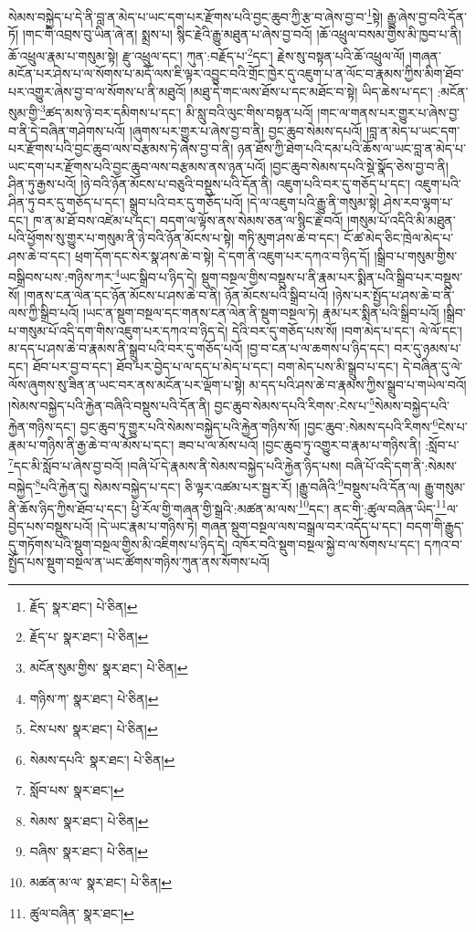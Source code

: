 སེམས་བསྐྱེད་པ་དེ་ནི་བླ་ན་མེད་པ་ཡང་དག་པར་རྫོགས་པའི་བྱང་ཆུབ་ཀྱི་རྩ་བ་ཞེས་བྱ་བ་\footnote{རྗོད་  སྣར་ཐང་།  པེ་ཅིན། }སྟེ། རྒྱུ་ཞེས་བྱ་བའི་དོན་ཏོ། །གང་གི་འབྲས་བུ་ཡིན་ཞེ་ན། སྨྲས་པ། སྙིང་རྗེའི་རྒྱུ་མཐུན་པ་ཞེས་བྱ་བའོ། །ཆོ་འཕྲུལ་བསམ་གྱིས་མི་ཁྱབ་པ་ནི། ཆོ་འཕྲུལ་རྣམ་པ་གསུམ་སྟེ། རྫུ་འཕྲུལ་དང་། ཀུན་:བརྗོད་པ་\footnote{རྗོད་པ་  སྣར་ཐང་།  པེ་ཅིན། }དང་། རྗེས་སུ་བསྟན་པའི་ཆོ་འཕྲུལ་ལོ། །གཞན་མངོན་པར་ཤེས་པ་ལ་སོགས་པ་མདོ་ལས་ཇི་ལྟར་འབྱུང་བའི་གྲོང་ཁྱེར་དུ་འཇུག་པ་ན་ལོང་བ་རྣམས་ཀྱིས་མིག་ཐོབ་པར་འགྱུར་ཞེས་བྱ་བ་ལ་སོགས་པ་ནི་མཐུའོ། །མཐུ་དེ་གང་ལས་ཐོས་པ་དང་མཐོང་བ་སྟེ། ཡིད་ཆེས་པ་དང་། :མངོན་སུམ་གྱི་\footnote{མངོན་སུམ་གྱིས་  སྣར་ཐང་།  པེ་ཅིན། }ཚད་མས་ཉེ་བར་དམིགས་པ་དང་། མི་སླུ་བའི་ལུང་གིས་བསྟན་པའོ། །གང་ལ་གནས་པར་གྱུར་པ་ཞེས་བྱ་བ་ནི་དེ་བཞིན་གཤེགས་པའོ། །ཞུགས་པར་གྱུར་པ་ཞེས་བྱ་བ་ནི། བྱང་ཆུབ་སེམས་དཔའོ། །བླ་ན་མེད་པ་ཡང་དག་པར་རྫོགས་པའི་བྱང་ཆུབ་ལས་བརྩམས་ཏེ་ཞེས་བྱ་བ་ནི། ཉན་ཐོས་ཀྱི་ཐེག་པའི་དམ་པའི་ཆོས་ལ་ཡང་བླ་ན་མེད་པ་ཡང་དག་པར་རྫོགས་པའི་བྱང་ཆུབ་ལས་བརྩམས་ནས་ཉན་པའོ། །བྱང་ཆུབ་སེམས་དཔའི་སྡེ་སྣོད་ཅེས་བྱ་བ་ནི། ཤིན་ཏུ་རྒྱས་པའོ། །ཉེ་བའི་ཉོན་མོངས་པ་བཅུའི་བསྡུས་པའི་དོན་ནི། འཇུག་པའི་བར་དུ་གཅོད་པ་དང་། འཇུག་པའི་ཤིན་ཏུ་བར་དུ་གཅོད་པ་དང་། སྒྲུབ་པའི་བར་དུ་གཅོད་པའོ། །དེ་ལ་འཇུག་པའི་རྒྱུ་ནི་གསུམ་སྟེ། ཤེས་རབ་ལྷག་པ་དང་། ཁ་ན་མ་ཐོ་བས་འཛེམ་པ་དང་། བདག་ལ་ལྟོས་ནས་སེམས་ཅན་ལ་སྙིང་རྗེ་བའོ། །གསུམ་པོ་འདིའི་མི་མཐུན་པའི་ཕྱོགས་སུ་གྱུར་པ་གསུམ་ནི་ཉེ་བའི་ཉོན་མོངས་པ་སྟེ། གཏི་མུག་ཤས་ཆེ་བ་དང་། ངོ་ཚ་མེད་ཅིང་ཁྲེལ་མེད་པ་ཤས་ཆེ་བ་དང་། ཕྲག་དོག་དང་སེར་སྣ་ཤས་ཆེ་བ་སྟེ། དེ་དག་ནི་འཇུག་པར་དཀའ་བ་ཉིད་དོ། །སྒྲིབ་པ་གསུམ་གྱིས་བསྒྲིབས་པས་:གཉིས་ཀར་\footnote{གཉིས་ཀ་  སྣར་ཐང་།  པེ་ཅིན། }ཡང་སྒྲིབ་པ་ཉིད་དེ། སྡུག་བསྔལ་གྱིས་བསྡུས་པ་ནི་རྣམ་པར་སྨིན་པའི་སྒྲིབ་པར་བསྡུས་སོ། །གནས་ངན་ལེན་དང་ཉོན་མོངས་པ་ཤས་ཆེ་བ་ནི། ཉོན་མོངས་པའི་སྒྲིབ་པའོ། །ཉེས་པར་སྤྱོད་པ་ཤས་ཆེ་བ་ནི་ལས་ཀྱི་སྒྲིབ་པའོ། །ཡང་ན་སྡུག་བསྔལ་དང་གནས་ངན་ལེན་ནི་སྡུག་བསྔལ་ཏེ། རྣམ་པར་སྨིན་པའི་སྒྲིབ་པའོ། །སྒྲིབ་པ་གསུམ་པོ་འདི་དག་གིས་འཇུག་པར་དཀའ་བ་ཉིད་དེ། དེའི་བར་དུ་གཅོད་པས་སོ། །བག་མེད་པ་དང་། ལེ་ལོ་དང་། མ་དད་པ་ཤས་ཆེ་བ་རྣམས་ནི་སྒྲུབ་པའི་བར་དུ་གཅོད་པའོ། །བྱ་བ་ངན་པ་ལ་ཆགས་པ་ཉིད་དང་། བར་དུ་ཉམས་པ་དང་། ཐོབ་པར་བྱ་བ་དང་། ཐོབ་པར་བྱེད་པ་ལ་དད་པ་མེད་པ་དང་། བག་མེད་པས་མི་སྒྲུབ་པ་དང་། དེ་བཞིན་དུ་ལེ་ལོས་ཞུགས་སུ་ཟིན་ན་ཡང་བར་ནས་མངོན་པར་ལྡོག་པ་སྟེ། མ་དད་པའི་ཤས་ཆེ་བ་རྣམས་ཀྱིས་སྒྲུབ་པ་གཡེལ་བའོ། །སེམས་བསྐྱེད་པའི་རྐྱེན་བཞིའི་བསྡུས་པའི་དོན་ནི། བྱང་ཆུབ་སེམས་དཔའི་རིགས་:ངེས་པ་\footnote{ངེས་པས་  སྣར་ཐང་།  པེ་ཅིན། }སེམས་བསྐྱེད་པའི་རྐྱེན་གཉིས་དང་། བྱང་ཆུབ་ཏུ་གྱུར་པའི་སེམས་བསྐྱེད་པའི་རྐྱེན་གཉིས་སོ། །བྱང་ཆུབ་:སེམས་དཔའི་རིགས་\footnote{སེམས་དཔའི་  སྣར་ཐང་།  པེ་ཅིན། }ངེས་པ་རྣམ་པ་གཉིས་ནི་རྒྱ་ཆེ་བ་ལ་མོས་པ་དང་། ཟབ་པ་ལ་མོས་པའོ། །བྱང་ཆུབ་ཏུ་འགྱུར་བ་རྣམ་པ་གཉིས་ནི། :སློབ་པ་\footnote{སློབ་པས་  སྣར་ཐང་། }དང་མི་སློབ་པ་ཞེས་བྱ་བའོ། །བཞི་པོ་དེ་རྣམས་ནི་སེམས་བསྐྱེད་པའི་རྐྱེན་ཉིད་པས། བཞི་པོ་འདི་དག་ནི་:སེམས་བསྐྱེད་\footnote{སེམས་  སྣར་ཐང་།  པེ་ཅིན། }པའི་རྐྱེན་དུ། སེམས་བསྐྱེད་པ་དང་། ཅི་ལྟར་འཚམ་པར་སྦྱར་རོ། །རྒྱུ་བཞིའི་\footnote{བཞིས་  སྣར་ཐང་།  པེ་ཅིན། }བསྡུས་པའི་དོན་ལ། རྒྱུ་གསུམ་ནི་ཆོས་ཉིད་ཀྱིས་ཐོབ་པ་དང་། ཕྱི་རོལ་གྱི་གཞན་གྱི་སྒྲའི་:མཚན་མ་ལས་\footnote{མཚན་མ་ལ་  སྣར་ཐང་།  པེ་ཅིན། }དང་། ནང་གི་:ཚུལ་བཞིན་ཡིད་\footnote{ཚུལ་བཞིན་  སྣར་ཐང་། }ལ་བྱེད་པས་བསྡུས་པའོ། །དེ་ཡང་རྣམ་པ་གཉིས་ཏེ། གཞན་སྡུག་བསྔལ་ལས་བསྒྲལ་བར་འདོད་པ་དང་། བདག་གི་རྒྱུད་དུ་གཏོགས་པའི་སྡུག་བསྔལ་གྱིས་མི་འཇིགས་པ་ཉིད་དེ། འཁོར་བའི་སྡུག་བསྔལ་སྐྱེ་བ་ལ་སོགས་པ་དང་། དཀའ་བ་སྤྱོད་པས་སྡུག་བསྔལ་ན་ཡང་ཚོགས་གཉིས་ཀུན་ནས་སོགས་པའོ། 